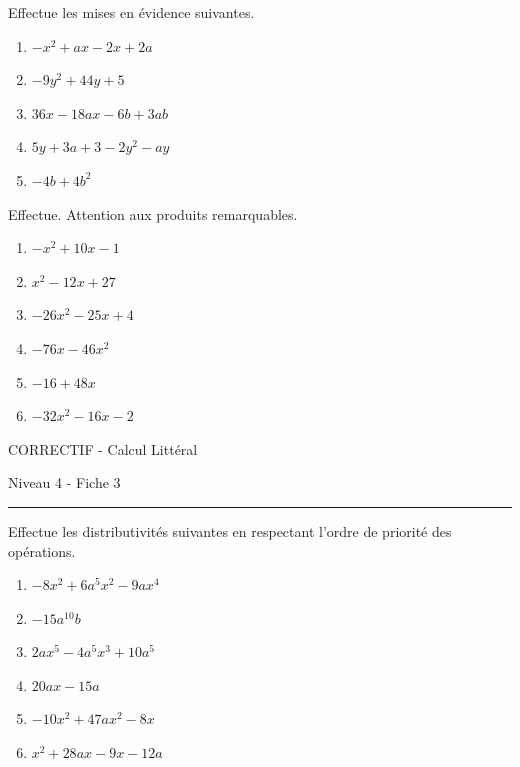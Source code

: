 \documentclass[12pt,parskip=half-, twoside=semi]{scrartcl}
\begin{document}
\begin{exercise}Effectue les mises en évidence suivantes.
  \begin{enumerate}[cols=2]
      \item $-x^2+ax-2x+2a$
      \item $-9y^2+44y+5$
      \item $36x-18ax-6b+3ab$
      \item $5y+3a+3-2y^2-ay$
      \item $-4b+4b^2$
  \end{enumerate}
\end{exercise}

\begin{exercise}Effectue. Attention aux produits remarquables.
  \begin{enumerate}
      \item $-x^2+10x-1$
      \item $x^2-12x+27$
      \item $-26x^2-25x+4$
      \item $-76x-46x^2$
      \item $-16+48x$
      \item $-32x^2-16x-2$
  \end{enumerate}
\end{exercise}

\newpage


\begin{center}
  \bfseries
  \begin{Huge}
    CORRECTIF - Calcul Littéral
  \end{Huge}
  \smallbreak
  \begin{large}
    Niveau 4  - Fiche 3
  \end{large}
  \smallbreak
  \rule[10pt]{.5\linewidth}{1 pt}
\end{center}
 
\setcounter{exercise}{0}


\begin{exercise}Effectue les distributivités suivantes en respectant l'ordre de priorité des opérations.
  \begin{enumerate}[cols=2]
      \item $-8x^2+6a^5x^2-9ax^4$
      \item $-15a^{10}b$
      \item $2ax^5-4a^5x^3+10a^5$
      \item $20ax-15a$
      \item $-10x^2+47ax^2-8x$
      \item $x^2+28ax-9x-12a$
  \end{enumerate}
\end{exercise}
\end{document}
